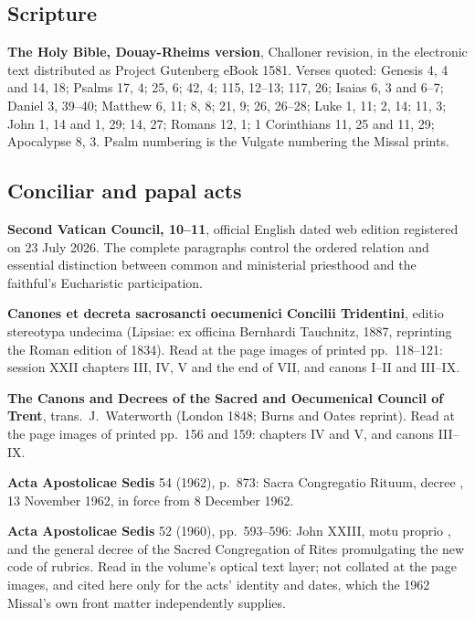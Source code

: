 \subsection*{Scripture}

\textbf{The Holy Bible, Douay-Rheims version}, Challoner revision, in the
electronic text distributed as Project Gutenberg eBook 1581. Verses quoted:
Genesis 4, 4 and 14, 18; Psalms 17, 4; 25, 6; 42, 4; 115, 12--13; 117, 26;
Isaias 6, 3 and 6--7; Daniel 3, 39--40; Matthew 6, 11; 8, 8; 21, 9; 26,
26--28; Luke 1, 11; 2, 14; 11, 3; John 1, 14 and 1, 29; 14, 27; Romans 12, 1;
1 Corinthians 11, 25 and 11, 29; Apocalypse 8, 3. Psalm numbering is the
Vulgate numbering the Missal prints.

\subsection*{Conciliar and papal acts}

\textbf{Second Vatican Council,  10--11}, official English
dated web edition registered on 23 July 2026. The complete paragraphs control
the ordered relation and essential distinction between common and ministerial
priesthood and the faithful's Eucharistic participation.

\textbf{Canones et decreta sacrosancti oecumenici Concilii Tridentini}, editio
stereotypa undecima (Lipsiae: ex officina Bernhardi Tauchnitz, 1887, reprinting
the Roman edition of 1834). Read at the page images of printed pp.~118--121:
session XXII chapters III, IV, V and the end of VII, and canons I--II
and III--IX.

\textbf{The Canons and Decrees of the Sacred and Oecumenical Council of
Trent}, trans.\ J.~Waterworth (London 1848; Burns and Oates reprint). Read at
the page images of printed pp.~156 and 159: chapters IV and V, and canons
III--IX.

\textbf{Acta Apostolicae Sedis} 54 (1962), p.~873: Sacra Congregatio Rituum,
decree , 13 November
1962, in force from 8 December 1962.

\textbf{Acta Apostolicae Sedis} 52 (1960), pp.~593--596: John XXIII, motu
proprio , and the general decree of the Sacred
Congregation of Rites promulgating the new code of rubrics. Read in the
volume's optical text layer; not collated at the page images, and cited here
only for the acts' identity and dates, which the 1962 Missal's own front matter
independently supplies.

